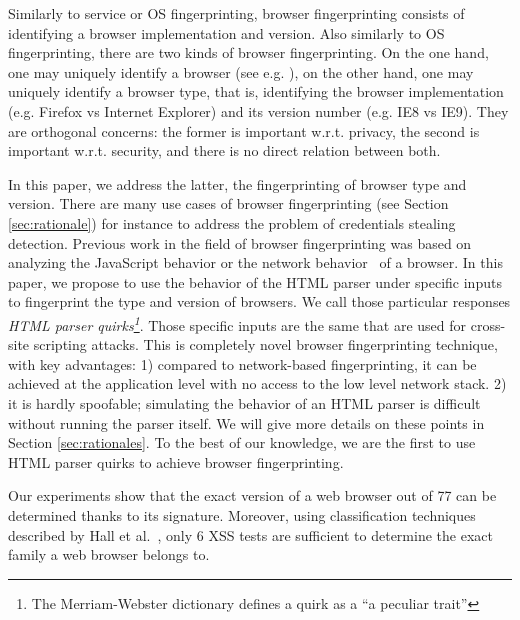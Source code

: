 \documentclass[10pt]{IEEEtran}
\begin{document}
Similarly to service or OS fingerprinting, browser fingerprinting consists 
of identifying a browser implementation and version.
Also similarly to OS fingerprinting, there are two kinds of browser fingerprinting.
On the one hand, one may uniquely identify a browser (see e.g. \cite{eckersley2010unique}), 
on the other hand, one may uniquely identify a browser type, that is, identifying the browser implementation (e.g. Firefox vs Internet Explorer) and its version number (e.g. IE8 vs IE9).
They are orthogonal concerns: the former is important w.r.t. privacy, the second is important w.r.t. security, and there is no direct relation between both.




In this paper, we address the latter, the fingerprinting of browser type and version.
There are many use cases of browser fingerprinting (see Section \ref{sec:rationale}) for instance to address the problem of credentials stealing detection.
Previous work in the field of browser fingerprinting was based on analyzing the 
JavaScript behavior \cite{mowery2011fingerprinting} or  the network behavior~\cite{yen2009browser} of a browser.
In this paper, we propose to use the behavior of the HTML parser under specific inputs to 
fingerprint the type and version of browsers. 
We call those particular responses \emph{HTML parser quirks\footnote{The Merriam-Webster
dictionary defines a quirk as a ``a peculiar trait''}}.
Those specific inputs are the same that are used for cross-site scripting 
attacks.
This is completely novel browser fingerprinting technique, with key advantages:
1) compared to network-based fingerprinting, it can be achieved at the application level with 
no access to the low level network stack.
2) it is hardly spoofable; simulating the behavior of an HTML parser is difficult without running the parser itself.
We will give more details on these points in Section \ref{sec:rationales}.
To the best of our knowledge, we are the first to use HTML parser quirks to achieve browser fingerprinting.




Our experiments show that the exact version
of a web browser out of 77 can be determined thanks to its signature. 
Moreover, using classification techniques described by Hall et al.~\cite{hall2009weka},  only $6$ XSS tests are 
sufficient to determine the exact family a web browser belongs to. 
\end{document}
